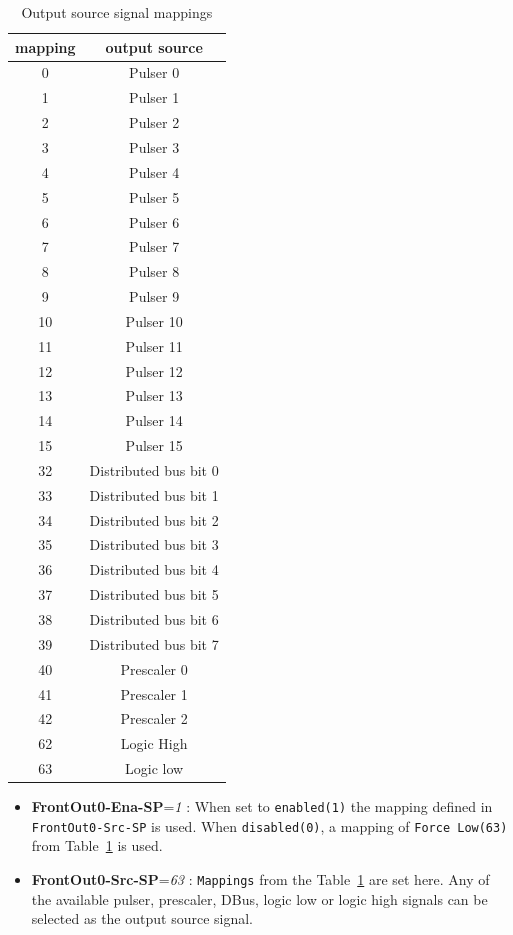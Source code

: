 \documentclass[12pt,a4paper]{article}
\begin{document}
\begin{table}[!hbt]
\caption{Output source signal mappings}
\label{tab:mappings}
\centering
	\begin{tabular}{|c|c|}
		\hline \textbf{mapping} & \textbf{output source} \\ \hline 
		\hline 0 & Pulser 0 \\ 
		\hline 1 & Pulser 1 \\ 
		\hline 2 & Pulser 2 \\ 
		\hline 3 & Pulser 3 \\ 
		\hline 4 & Pulser 4 \\ 
		\hline 5 & Pulser 5 \\ 
		\hline 6 & Pulser 6 \\ 
		\hline 7 & Pulser 7 \\ 
		\hline 8 & Pulser 8 \\ 
		\hline 9 & Pulser 9 \\ 
		\hline 10 & Pulser 10 \\ 
		\hline 11 & Pulser 11 \\ 
		\hline 12 & Pulser 12 \\ 
		\hline 13 & Pulser 13 \\ 
		\hline 14 & Pulser 14 \\ 
		\hline 15 & Pulser 15 \\ 
		\hline 32 & Distributed bus bit 0 \\ 
		\hline 33 & Distributed bus bit 1 \\ 
		\hline 34 & Distributed bus bit 2 \\ 
		\hline 35 & Distributed bus bit 3 \\ 
		\hline 36 & Distributed bus bit 4 \\ 
		\hline 37 & Distributed bus bit 5 \\ 
		\hline 38 & Distributed bus bit 6 \\ 
		\hline 39 & Distributed bus bit 7 \\ 
		\hline 40 & Prescaler 0 \\ 
		\hline 41 & Prescaler 1 \\ 
		\hline 42 & Prescaler 2 \\ 
		\hline 62 & Logic High \\ 
		\hline 63 & Logic low \\ 
		\hline 
	\end{tabular} 
\end{table}

  \begin{itemize}
  \item
   \textbf{FrontOut0-Ena-SP}=\emph{1} : When set to \texttt{enabled(1)} the mapping
    defined in \texttt{FrontOut0-Src-SP} is used. When \texttt{disabled(0)}, a
    mapping of \texttt{Force Low(63)} from Table~\ref{tab:mappings} is used.
  \item
    \textbf{FrontOut0-Src-SP}=\emph{63} : \texttt{Mappings} from the Table~\ref{tab:mappings} are
    set here. Any of the available pulser, prescaler, DBus, logic low or
    logic high signals can be selected as the output source signal.
  \end{itemize}
\end{document}
